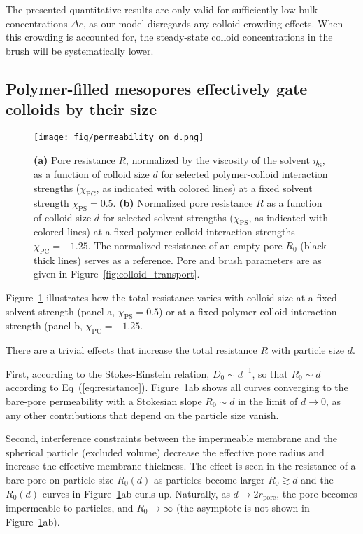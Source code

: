 \documentclass[12pt, a4paper]{article}
\begin{document}
The presented quantitative results are only valid for sufficiently low bulk concentrations $\Delta c$, as our model disregards any colloid crowding effects.
When this crowding is accounted for, the steady-state colloid concentrations in the brush will be systematically lower.


\subsection{Polymer-filled mesopores effectively gate colloids by their size}

\begin{figure}
    \centering
    \texttt{[image: fig/permeability\_on\_d.png]}
    \caption{
    \textbf{(a)} 
    Pore resistance $R$, normalized by the viscosity of the solvent $\eta_\text{S}$, as a function of colloid size $d$ for selected polymer-colloid interaction strengths ($\chi_{\text{PC}}$, as indicated with colored lines) at a fixed solvent strength $\chi_{\text{PS}} =0.5$.
    \textbf{(b)}
    Normalized pore resistance $R$ as a function of colloid size $d$ for selected solvent strengths ($\chi_{\text{PS}}$, as indicated with colored lines) at a fixed polymer-colloid interaction strengths $\chi_{\text{PC}} = -1.25$. 
    The normalized resistance of an empty pore $R_{0}$ (black thick lines) serves as a reference.
    Pore and brush parameters are as given in Figure~\ref{fig:colloid_transport}. 
    }
    \label{fig:R_vs_d}
\end{figure}

Figure~\ref{fig:R_vs_d} illustrates how the total resistance varies with colloid size at a fixed solvent strength (panel a, $\chi_{\text{PS}} = 0.5$) or at a fixed polymer-colloid interaction strength (panel b, $\chi_{\text{PC}} = -1.25$.

There are a trivial effects that increase the total resistance $R$ with particle size $d$.

First, according to the Stokes-Einstein relation, $D_0 \sim d^{-1}$, so that $R_0 \sim d$ according to Eq~(\ref{eq:resistance}). 
Figure~\ref{fig:R_vs_d}ab shows all curves converging to the bare-pore permeability with a Stokesian slope $R_0 \sim d$ in the limit of $d \to 0$, as any other contributions that depend on the particle size vanish.

Second, interference constraints between the impermeable membrane and the spherical particle (excluded volume) decrease the effective pore radius and increase the effective membrane thickness.
The effect is seen in the resistance of a bare pore on particle size $R_0(d)$ as particles become larger $R_0 \gtrsim  d$ and the $R_0(d)$ curves in Figure~\ref{fig:R_vs_d}ab curls up.
Naturally, as $d \to 2r_{\text{pore}}$, the pore becomes impermeable to particles, and $R_0 \to \infty$ (the asymptote is not shown in Figure~\ref{fig:R_vs_d}ab).
\end{document}
